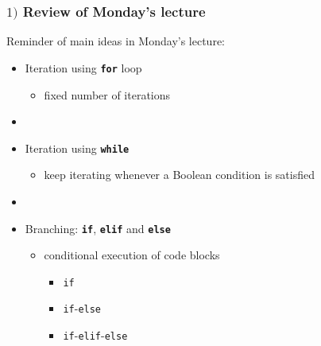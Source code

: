 \documentclass[english,14pt]{beamer}
\begin{document}
\begin{frame}[fragile]

\frametitle{$1)$ Review of Monday's lecture}

Reminder of main ideas in Monday's lecture:

\begin{itemize}
	\item Iteration using \textbf{\texttt{for}} loop
	\begin{itemize}
		\item fixed number of iterations
	\end{itemize}

	\item[]
	
	\item Iteration using \textbf{\texttt{while}}
		\begin{itemize}
			\item keep iterating whenever a Boolean condition is satisfied
		\end{itemize}

	\item[]
	
	\item Branching: \textbf{\texttt{if}}, \textbf{\texttt{elif}} and \textbf{\texttt{else}}
		\begin{itemize}
			\item conditional execution of code blocks
			\begin{itemize}
				\item \texttt{if}
				\item \texttt{if}-\texttt{else}
				\item \texttt{if}-\texttt{elif}-\texttt{else}
			\end{itemize}
		\end{itemize}
		
\end{itemize}

\end{frame}

\end{document}
